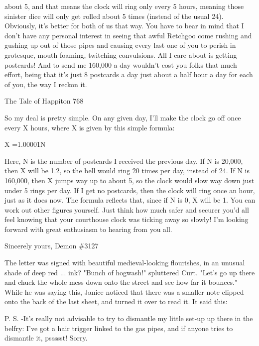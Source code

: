 about 5, and that means the clock will ring only every 5 hours, meaning those sinister
dice will only get rolled about 5 times (instead of the usual 24). Obviously, it's better
for both of us that way. You have to bear in mind that I don't have any personal
interest in seeing that awful Retchgoo come rushing and gushing up out of those pipes
and causing every last one of you to perish in grotesque, mouth-foaming, twitching
convulsions. All I care about is getting postcards! And to send me 160,000 a day
wouldn't cost you folks that much effort, being that it's just 8 postcards a day just
about a half hour a day for each of you, the way I reckon it.




The Tale of Happiton                                                                  768

       So my deal is pretty simple. On any given day, I'll make the clock go off once
every X hours, where X is given by this simple formula:

       X =1.00001N

Here, N is the number of postcards I received the previous day. If N is 20,000, then X
will be 1.2, so the bell would ring 20 times per day, instead of 24. If N is 160,000,
then X jumps way up to about 5, so the clock would slow way down just under 5 rings
per day. If I get no postcards, then the clock will ring once an hour, just as it does
now. The formula reflects that, since if N is 0, X will be 1. You can work out other
figures yourself. Just think how much safer and securer you'd all feel knowing that
your courthouse clock was ticking away so slowly!
       I'm looking forward with great enthusiasm to hearing from you all.

                                                                           Sincerely yours,
                                                                             Demon \#3127

       The letter was signed with beautiful medieval-looking flourishes, in an
unusual shade of deep red ... ink?
       "Bunch of hogwash!" spluttered Curt. "Let's go up there and chuck the whole
mess down onto the street and see how far it bounces." While he was saying this,
Janice noticed that there was a smaller note clipped onto the back of the last sheet,
and turned it over to read it. It said this:

P. S. -It's really not advisable to try to dismantle my little set-up up there in the belfry:
I've got a hair trigger linked to the gas pipes, and if anyone tries to dismantle it,
pssssst! Sorry.

